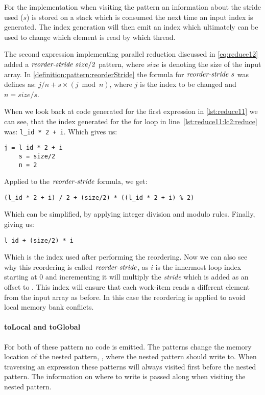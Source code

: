 For the implementation when visiting the \reorderStride pattern an information about the stride used ($s$) is stored on a stack which is consumed the next time an input index is generated.
The index generation will then emit an index which ultimately can be used to change which element is read by which thread.

The second expression implementing parallel reduction discussed in \autoref{eq:reduce12} added a $\text{\textit{reorder-stride}}\ size/2$ pattern, where $size$ is denoting the size of the input array.
In \autoref{definition:pattern:reorderStride} the formula for $\text{\textit{reorder-stride}}\ s$ was defines as: $j / n + s \times (j \bmod{n})$, where $j$ is the index to be changed and $n = size / s$.

When we look back at \OpenCL code generated for the first expression in \autoref{lst:reduce11} we can see, that the index generated for the for loop in line~\ref{lst:reduce11:lc2:reduce} was:
\lstinline!l_id * 2 + i!.
Which gives us:
\begin{lstlisting}[numbers=none, frame=none]
    j = l_id * 2 + i
    s = size/2
    n = 2
\end{lstlisting}
Applied to the $\text{\textit{reorder-stride}}$ formula, we get:
\begin{lstlisting}[numbers=none, frame=none]
    (l_id * 2 + i) / 2 + (size/2) * ((l_id * 2 + i) % 2)
\end{lstlisting}
Which can be simplified, by applying integer division and modulo rules. Finally, giving us:
\begin{lstlisting}[numbers=none, frame=none]
    l_id + (size/2) * i
\end{lstlisting}
Which is the index used after performing the reordering.
Now we can also see why this reordering is called $\text{\textit{reorder-stride}}$, as $i$ is the innermost loop index starting at 0 and incrementing it will multiply the \emph{stride} which is added as an offset to .
This index will ensure that each work-item reads a different element from the input array as before.
In this case the reordering is applied to avoid local memory bank conflicts.

\paragraph{{\footnotesize to}Local and {\footnotesize to}Global}
For both of these pattern no \OpenCL code is emitted.
The patterns change the memory location of the nested pattern, \ie, where the nested pattern should write to.
When traversing an expression these patterns will always visited first before the nested pattern.
The information on where to write is passed along when visiting the nested pattern.

